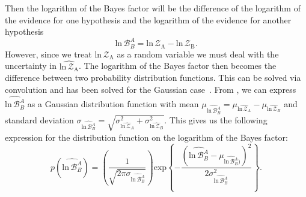 Then the logarithm of the Bayes factor will be the difference of the logarithm of the evidence for one hypothesis and the logarithm of the evidence for another hypothesis
\begin{equation}\label{eqn:log_bayes_factor}
    \mathrm{ln} \, \mathcal{B}^A_B = \mathrm{ln} \, \mathcal{Z}_{\mathrm{A}} - \mathrm{ln} \, \mathcal{Z}_{\mathrm{B}}.
\end{equation}
However, since we treat $\mathrm{ln} \, \mathcal{Z}_{\mathrm{A}}$ as a random variable we must deal with the uncertainty in $\widehat{\mathrm{ln} \, \mathcal{Z}_{\mathrm{A}}}$. The logarithm of the Bayes factor then becomes the difference between two probability distribution functions. This can be solved via convolution and has been solved for the Gaussian case~\citep{bromiley2003products}. From \cite{bromiley2003products}, we can express $\widehat{\mathrm{ln} \, \mathcal{B}^A_B}$ as a Gaussian distribution function with mean $\mu_{\widehat{\mathrm{ln} \, \mathcal{B}^A_B}} = \mu_{\widehat{\mathrm{ln} \, \mathcal{Z}_A}} - \mu_{\widehat{\mathrm{ln} \, \mathcal{Z}_B}}$ and standard deviation $\sigma_{\widehat{\mathrm{ln} \, \mathcal{B}^A_B}} = \sqrt{\sigma_{\widehat{\mathrm{ln} \, \mathcal{Z}_A}}^2 + \sigma_{\widehat{\mathrm{ln} \, \mathcal{Z}_B}}^2 }$. This gives us the following expression for the distribution function on the logarithm of the Bayes factor:
\begin{equation}\label{eqn:p_log_b}
    p(\widehat{\mathrm{ln} \, \mathcal{B}^A_B}) = \left(\frac{1}{\sqrt{2 \pi \sigma_{\widehat{\mathrm{ln} \, \mathcal{B}^A_B}}}} \right) \mathrm{exp} \left \{-\frac{\left(\widehat{\mathrm{ln} \, \mathcal{B}^A_B} - \mu_{\widehat{\mathrm{ln} \, \mathcal{B}^A_B})}\right)^2} {2 \sigma^2_{\widehat{\mathrm{ln} \, \mathcal{B}^A_B}}}  \right\}.
\end{equation}

